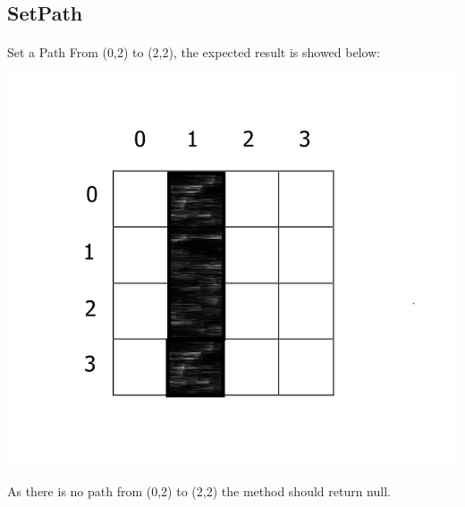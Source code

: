 \documentclass[11pt, a4paper]{report}
\begin{document}
\subsection{SetPath}
\paragraph{}Set a Path From (0,2) to (2,2), the expected result is showed below:\\
\begin{center}
\includegraphics[scale=0.4]{./image/Test5SetPath.png}
\end{center}
\paragraph{}As there is no path from (0,2) to (2,2) the method should return null.
\end{document}
